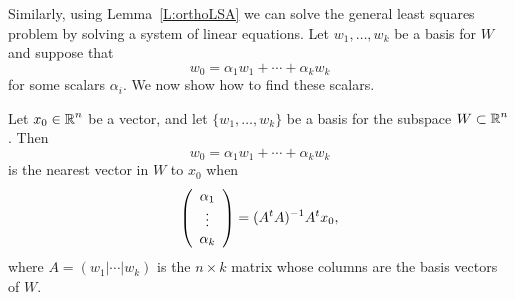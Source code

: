 \documentclass{ximera}
\begin{document}
Similarly, using Lemma~\ref{L:orthoLSA} we can solve the general least
squares problem by solving a system of linear equations.  Let
$w_1,\ldots,w_k$ be a basis for $W$ and suppose that
\[
w_0 = \alpha_1w_1 + \cdots + \alpha_kw_k
\]
for some scalars $\alpha_i$.  We now show how to find these scalars.

\begin{theorem}  \label{T:nearestvector}
Let $x_0\in\mbox{$\Bbb{R}$}^n$ be a vector, and let $\{w_1,\ldots,w_k\}$ be a
basis for the subspace $W\subset\mbox{$\Bbb{R}$}^n$.
Then
\[
w_0 = \alpha_1w_1 + \cdots + \alpha_kw_k
\]
is the nearest vector in $W$ to $x_0$ when
\begin{equation}  \label{E:nearestvector}
\left(\begin{array}{c} \alpha_1 \\ \vdots \\ \alpha_k \end{array}\right) =
(A^tA)^{-1} A^tx_0,
\end{equation}
where $A=(w_1|\cdots|w_k)$ is the $n\times k$ matrix whose columns are the
basis vectors of $W$.
\end{theorem}
\end{document}
